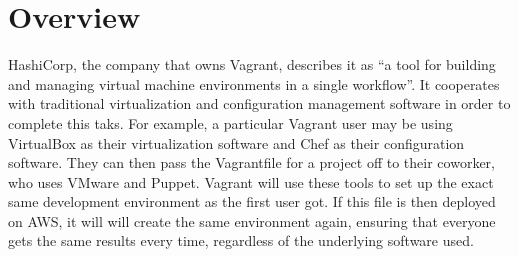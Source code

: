 \usepackage{csquotes}



\section{Overview}
HashiCorp, the company that owns Vagrant, describes it as \enquote{a tool for
building and managing virtual machine environments in a single workflow}. It
cooperates with traditional virtualization and configuration management
software in order to complete this taks. For example, a particular Vagrant
user may be using VirtualBox as their virtualization software and Chef as
their configuration software. They can then pass the Vagrantfile for a
project off to their coworker, who uses VMware and Puppet. Vagrant will use
these tools to set up the exact same development environment as the first
user got. If this file is then deployed on AWS, it will will create the same
environment again, ensuring that everyone gets the same results every time,
regardless of the underlying software used.



